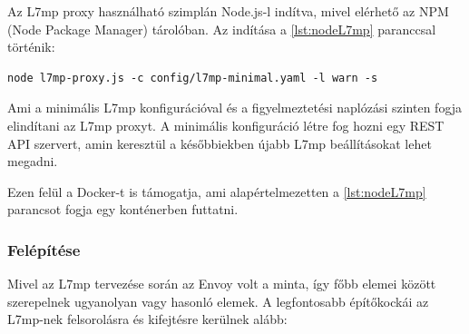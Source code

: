Az L7mp proxy használható szimplán Node.js-l indítva, mivel elérhető az NPM (Node 
Package Manager) tárolóban. Az indítása a \ref{lst:nodeL7mp} paranccsal történik: 

\begin{lstlisting}[caption=L7mp indítása Node.js segítségével, label=lst:nodeL7mp]
node l7mp-proxy.js -c config/l7mp-minimal.yaml -l warn -s
\end{lstlisting}

Ami a minimális L7mp konfigurációval és a figyelmeztetési naplózási szinten fogja
elindítani az L7mp proxyt. A minimális konfiguráció létre fog hozni egy REST API
szervert, amin keresztül a későbbiekben újabb L7mp beállításokat lehet megadni.

Ezen felül a Docker-t is támogatja, ami alapértelmezetten a \ref{lst:nodeL7mp} parancsot fogja
egy konténerben futtatni.

\subsubsection{Felépítése}

Mivel az L7mp tervezése során az Envoy volt a minta, így főbb elemei között szerepelnek
ugyanolyan vagy hasonló elemek. A legfontosabb építőkockái az L7mp-nek 
felsorolásra és kifejtésre kerülnek alább: 

